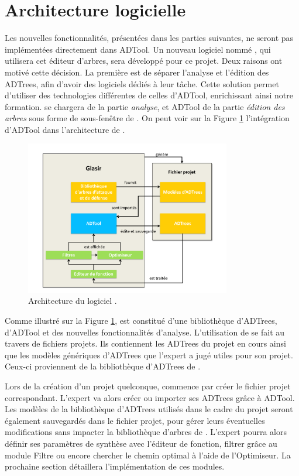 \section{Architecture logicielle}

Les nouvelles fonctionnalités, présentées dans les parties suivantes, ne seront pas implémentées directement dans ADTool. Un nouveau logiciel nommé \glasir{}, qui utilisera cet éditeur d'arbres, sera développé pour ce projet. Deux raisons ont motivé cette décision. 
La première est de séparer l'analyse et l'édition des ADTrees, afin d'avoir des logiciels dédiés à leur tâche. Cette solution permet d'utiliser des technologies différentes de celles d'ADTool, enrichissant ainsi notre formation. \glasir{} se chargera de la partie \textit{analyse}, et ADTool de la partie \textit{édition des arbres} sous forme de sous-fenêtre de \glasir{}. On peut voir sur la {\sc Figure} \ref{fig:architecture_Glasir} l'intégration d'ADTool dans l'architecture de \glasir{}.

	\begin{figure}[h!]
		\centering
			\includegraphics[width=0.8\textwidth]{figure/archiGlasir.pdf}
		\caption{Architecture du logiciel \glasir{}.}
		\label{fig:architecture_Glasir}
	\end{figure}

Comme illustré sur la {\sc Figure} \ref{fig:architecture_Glasir}, \glasir{} est constitué d'une bibliothèque d'ADTrees, d'ADTool et des nouvelles fonctionnalités d'analyse. L'utilisation de \glasir{} se fait au travers de fichiers projets. Ils contiennent les ADTrees du projet en cours ainsi que les modèles génériques d'ADTrees que l'expert a jugé utiles pour son projet. Ceux-ci proviennent de la bibliothèque d'ADTrees de \glasir{}.
	
Lors de la création d'un projet quelconque, \glasir{} commence par créer le fichier projet correspondant. L'expert va alors créer ou importer ses ADTrees grâce à ADTool. Les modèles de la bibliothèque d'ADTrees utilisés dans le cadre du projet seront également sauvegardés dans le fichier projet, pour gérer leurs éventuelles modifications sans impacter la bibliothèque d'arbres de \glasir{}. L'expert pourra alors définir ses paramètres de synthèse avec l'éditeur de fonction, filtrer grâce au module Filtre ou encore chercher le chemin optimal à l'aide de l'Optimiseur. La prochaine section détaillera l'implémentation de ces modules. 